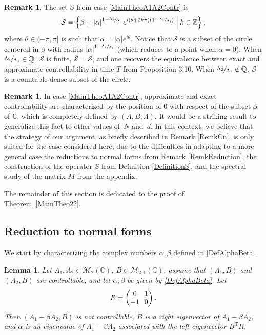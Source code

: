 \documentclass[10pt]{article}
\theoremstyle{plain}
\newtheorem{lemm}[theo]{Lemma}
\theoremstyle{definition}
\newtheorem{remk}[theo]{Remark}
\newcommand{\midsuchthat}{\;\middle|\:}
\newcommand{\transp}{{\scriptscriptstyle\mathrm{T}}}
\newcommand{\abs}[1]{\left\lvert #1\right \rvert}
\numberwithin{equation}{section}\numberwithin{figure}{section}\emergencystretch=3em
\begin{document}
\begin{remk}
The set $\mathcal S$ from case \eqref{MainTheoA1A2Contr} is
\[
\mathcal S = \left\{\beta + \abs{\alpha}^{1 - \sfrac{\Lambda_2}{\Lambda_1}} e^{i (\theta + 2 k \pi)\left(1 - \sfrac{\Lambda_2}{\Lambda_1}\right)} \midsuchthat k \in \mathbb Z\right\},
\]
where $\theta \in (-\pi, \pi]$ is such that $\alpha = \abs{\alpha} e^{i\theta}$. Notice that $\mathcal S$ is a subset of the circle centered in $\beta$ with radius $\abs{\alpha}^{1 - \sfrac{\Lambda_2}{\Lambda_1}}$ (which reduces to a point when $\alpha = 0$). When $\sfrac{\Lambda_2}{\Lambda_1} \in \mathbb Q$, $\mathcal S$ is finite, $\overline{\mathcal S} = \mathcal S$, and one recovers the equivalence between exact and approximate controllability in time $T$ from Proposition 3.10. When $\sfrac{\Lambda_2}{\Lambda_1} \notin \mathbb Q$, $\mathcal S$ is a countable dense subset of the circle.
\end{remk}

\begin{remk}
In case \eqref{MainTheoA1A2Contr}, approximate and exact controllability are characterized by the position of $0$ with respect of the subset $\mathcal S$ of $\mathbb C$, which is completely defined by $(A, B, \Lambda)$. It would be a striking result to generalize this fact to other values of~$N$ and~$d$. In this context, we believe that the strategy of our argument, as briefly described in Remark \ref{RemkCn}, is only suited for the case considered here, due to the difficulties in adapting to a more general case the reductions to normal forms from Remark \ref{RemkReduction}, the construction of the operator $S$ from Definition \ref{DefinitionS}, and the spectral study of the matrix $M$ from the appendix.
\end{remk}

The remainder of this section is dedicated to the proof of Theorem~\ref{MainTheo22}.

\subsection{Reduction to normal forms}
\label{SecReduction}

We start by characterizing the complex numbers $\alpha, \beta$ defined in \eqref{DefAlphaBeta}.

\begin{lemm}
\label{LemmAlphaEigenvalue}
Let $A_1, A_2 \in \mathcal M_2(\mathbb C)$, $B \in \mathcal M_{2, 1}(\mathbb C)$, assume that $(A_1, B)$ and $(A_2, B)$ are controllable, and let $\alpha, \beta$ be given by \eqref{DefAlphaBeta}. Let
\begin{equation}
\label{DefR}\arraycolsep3.5pt
R = \begin{pmatrix}
0 & 1 \\
-1 & 0 \\
\end{pmatrix}.
\end{equation}
Then $(A_1 - \beta A_2, B)$ is not controllable, $B$ is a right eigenvector of $A_1 - \beta A_2$, and $\alpha$ is an eigenvalue of $A_1 - \beta A_2$ associated with the left eigenvector $B^\transp R$.
\end{lemm}
\end{document}
